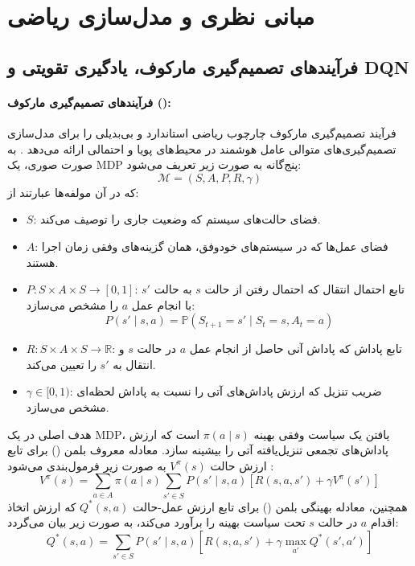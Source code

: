 \documentclass[oneside,openany,phd]{TMU-Thesis}
\begin{document}
\section{مبانی نظری و مدل‌سازی ریاضی}

\subsection{فرآیندهای تصمیم‌گیری مارکوف، یادگیری تقویتی و DQN}

\paragraph{فرآیندهای تصمیم‌گیری مارکوف ():}

فرآیند تصمیم‌گیری مارکوف چارچوب ریاضی استاندارد و بی‌بدیلی را برای مدل‌سازی تصمیم‌گیری‌های متوالی عامل هوشمند در محیط‌های پویا و احتمالی ارائه می‌دهد \cite{puterman1994markov}. به صورت صوری، یک MDP پنج‌گانه به صورت زیر تعریف می‌شود:
$$\mathcal{M} = (S, A, P, R, \gamma)$$
که در آن مولفه‌ها عبارتند از:
\begin{itemize}
    \item $S$: فضای حالت‌های سیستم که وضعیت جاری را توصیف می‌کند.
    \item $A$: فضای عمل‌ها که در سیستم‌های خودوفق، همان گزینه‌های وفقی زمان اجرا هستند.
    \item $P: S \times A \times S \rightarrow [0, 1]$: تابع احتمال انتقال که احتمال رفتن از حالت $s$ به حالت $s'$ با انجام عمل $a$ را مشخص می‌سازد:
    $$P(s' \mid s, a) = \mathbb{P}(S_{t+1} = s' \mid S_t = s, A_t = a)$$
    \item $R: S \times A \times S \rightarrow \mathbb{R}$: تابع پاداش که پاداش آنی حاصل از انجام عمل $a$ در حالت $s$ و انتقال به $s'$ را تعیین می‌کند.
    \item $\gamma \in [0, 1)$: ضریب تنزیل که ارزش پاداش‌های آتی را نسبت به پاداش لحظه‌ای مشخص می‌سازد.
\end{itemize}

هدف اصلی در یک MDP، یافتن یک سیاست وفقی بهینه $\pi(a \mid s)$ است که ارزش پاداش‌های تجمعی تنزیل‌یافته آتی را بیشینه سازد. معادله معروف بلمن () برای تابع ارزش حالت $V^\pi(s)$ به صورت زیر فرمول‌بندی می‌شود \cite{sutton2018reinforcement}:
$$V^\pi(s) = \sum_{a \in A} \pi(a \mid s) \sum_{s' \in S} P(s' \mid s, a) \left[ R(s, a, s') + \gamma V^\pi(s') \right]$$
همچنین، معادله بهینگی بلمن () برای تابع ارزش عمل-حالت $Q^*(s, a)$ که ارزش اتخاذ اقدام $a$ در حالت $s$ تحت سیاست بهینه را برآورد می‌کند، به صورت زیر بیان می‌گردد:
$$Q^*(s, a) = \sum_{s' \in S} P(s' \mid s, a) \left[ R(s, a, s') + \gamma \max_{a'} Q^*(s', a') \right]$$
\end{document}
